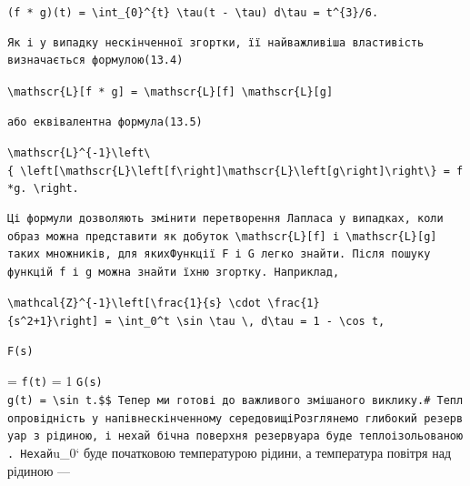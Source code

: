\documentclass[
  ukrainian,
]{article}
\begin{document}
\texttt{(f\ *\ g)(t)\ =\ \textbackslash{}int\_\{0\}\^{}\{t\}\ \textbackslash{}tau(t\ -\ \textbackslash{}tau)\ d\textbackslash{}tau\ =\ t\^{}\{3\}/6.}

\begin{verbatim}
Як і у випадку нескінченної згортки, її найважливіша властивість визначається формулою(13.4)
\end{verbatim}

\texttt{\textbackslash{}mathscr\{L\}{[}f\ *\ g{]}\ =\ \textbackslash{}mathscr\{L\}{[}f{]}\ \textbackslash{}mathscr\{L\}{[}g{]}}

\begin{verbatim}
або еквівалентна формула(13.5)
\end{verbatim}

\texttt{\textbackslash{}mathscr\{L\}\^{}\{-1\}\textbackslash{}left\textbackslash{}\{\ \textbackslash{}left{[}\textbackslash{}mathscr\{L\}\textbackslash{}left{[}f\textbackslash{}right{]}\textbackslash{}mathscr\{L\}\textbackslash{}left{[}g\textbackslash{}right{]}\textbackslash{}right\textbackslash{}\}\ =\ f*g.\ \textbackslash{}right.}

\begin{verbatim}
Ці формули дозволяють змінити перетворення Лапласа у випадках, коли образ можна представити як добуток \mathscr{L}[f] і \mathscr{L}[g] таких множників, для якихФункції F і G легко знайти. Після пошуку функцій f і g можна знайти їхню згортку. Наприклад,
\end{verbatim}

\texttt{\textbackslash{}mathcal\{Z\}\^{}\{-1\}\textbackslash{}left{[}\textbackslash{}frac\{1\}\{s\}\ \textbackslash{}cdot\ \textbackslash{}frac\{1\}\{s\^{}2+1\}\textbackslash{}right{]}\ =\ \textbackslash{}int\_0\^{}t\ \textbackslash{}sin\ \textbackslash{}tau\ \textbackslash{},\ d\textbackslash{}tau\ =\ 1\ -\ \textbackslash{}cos\ t,}

\begin{verbatim}
F(s)
\end{verbatim}

=   \texttt{f(t)} = 1
\quad \texttt{G(s)}
\texttt{g(t)\ =\ \textbackslash{}sin\ t.\$\$\ Тепер\ ми\ готові\ до\ важливого\ змішаного\ виклику.\#\ Теплопровідність\ у\ напівнескінченному\ середовищіРозглянемо\ глибокий\ резервуар\ з\ рідиною,\ і\ нехай\ бічна\ поверхня\ резервуара\ буде\ теплоізольованою.\ Нехай}u\_0`
буде початковою температурою рідини, а температура повітря над рідиною
---
\end{document}
